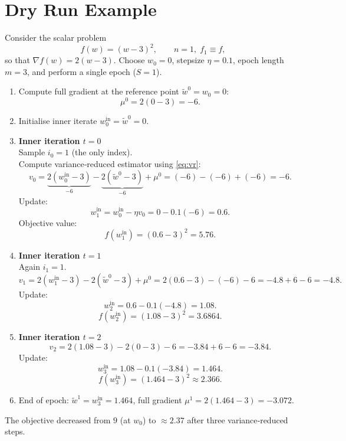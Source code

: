 \documentclass{article}
\newcommand{\grad}{\nabla}
\begin{document}
\section*{Dry Run Example}
Consider the scalar problem
\[
f(w)=(w-3)^2,\qquad n=1,\; f_1\equiv f,
\]
so that $\grad f(w)=2(w-3)$.  
Choose $w_0=0$, stepsize $\eta=0.1$, epoch length $m=3$, and perform a single epoch ($S=1$).

\medskip
\begin{enumerate}[label=Step \arabic*:, leftmargin=*, nosep]
\item Compute full gradient at the reference point $\tilde w^{0}=w_0=0$:
\[
\mu^{0}=2(0-3)=-6.
\]
\item Initialise inner iterate $w_0^{\text{in}}=\tilde w^{0}=0$.
\item \textbf{Inner iteration $t=0$}\\
Sample $i_0=1$ (the only index).\\
Compute variance‑reduced estimator using \eqref{eq:vr}:
\[
v_0 = \underbrace{2(w_0^{\text{in}}-3)}_{-6}
      -\underbrace{2(\tilde w^{0}-3)}_{-6}
      +\mu^{0}=(-6)-(-6)+(-6)=-6.
\]
Update:
\[
w_1^{\text{in}} = w_0^{\text{in}}-\eta v_0 =0-0.1(-6)=0.6.
\]
Objective value:
\[
f(w_1^{\text{in}}) = (0.6-3)^2 = 5.76.
\]

\item \textbf{Inner iteration $t=1$}\\
Again $i_1=1$.  
\[
v_1 = 2(w_1^{\text{in}}-3)-2(\tilde w^{0}-3)+\mu^{0}
     = 2(0.6-3)-(-6)-6 = -4.8+6-6 = -4.8.
\]
Update:
\[
w_2^{\text{in}} = 0.6-0.1(-4.8)=1.08.
\]
\[
f(w_2^{\text{in}}) = (1.08-3)^2 = 3.6864.
\]

\item \textbf{Inner iteration $t=2$}\\
\[
v_2 = 2(1.08-3)-2(0-3)-6 = -3.84+6-6 = -3.84.
\]
Update:
\[
w_3^{\text{in}} = 1.08-0.1(-3.84)=1.464.
\]
\[
f(w_3^{\text{in}}) = (1.464-3)^2 \approx 2.366.
\]

\item End of epoch: $\tilde w^{1}=w_3^{\text{in}}=1.464$, full gradient $\mu^{1}=2(1.464-3)=-3.072$.
\end{enumerate}
The objective decreased from $9$ (at $w_0$) to $\approx2.37$ after three variance‑reduced steps.

\newpage
\end{document}
